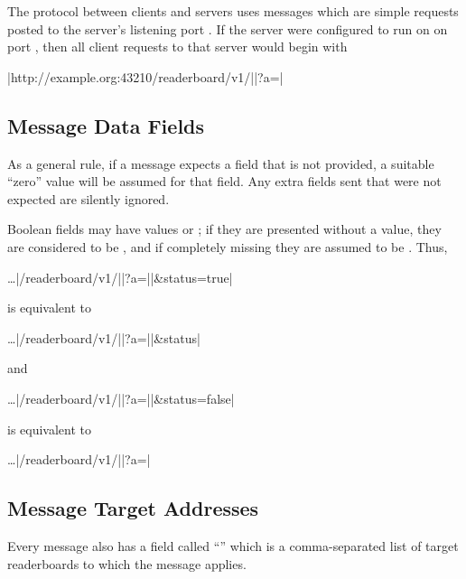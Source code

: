 The protocol between clients and servers uses messages which are simple  requests
posted to the server's listening port . If the server were configured to run
on  on port , then all client requests to that server would begin with

\begin{Coding}
	|http://example.org:43210/readerboard/v1/||?a=|
\end{Coding}

\subsection{Message Data Fields}
As a general rule, if a message expects a field that is not provided, a suitable ``zero'' value will be assumed
for that field. Any extra fields sent that were not expected are silently ignored.

Boolean fields may have values  or ; if they are presented without a value, they are considered to be
, and if completely missing they are assumed to be . Thus,

\begin{Coding}
	\dots|/readerboard/v1/||?a=||&status=true|
\end{Coding}

\noindent is equivalent to

\begin{Coding}
	\dots|/readerboard/v1/||?a=||&status|
\end{Coding}

\noindent and

\begin{Coding}
	\dots|/readerboard/v1/||?a=||&status=false|
\end{Coding}

\noindent is equivalent to

\begin{Coding}
	\dots|/readerboard/v1/||?a=|
\end{Coding}

\subsection{Message Target Addresses}
Every message also has a field called ``'' which is a comma-separated list of target readerboards to which the message
applies.


